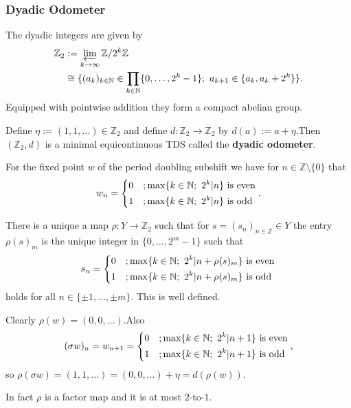 \begin{frame}
	\frametitle{Dyadic Odometer}
	The dyadic integers are given by
	\begin{align*}
		\mathbb{Z}_2 &:= \varprojlim_{k \to \infty} \mathbb{Z}/2^k\mathbb{Z}\\
		&\cong \{(a_k)_{k \in \mathbb{N}} \in \prod_{k \in \mathbb{N}} \{0, \dots, 2^k-1\};\ a_{k+1} \in \{a_k, a_k + 2^k\}\}.
	\end{align*}\pause
	Equipped with pointwise addition they form a compact abelian group.\pause
	
	Define $\eta := (1, 1, \dots) \in \mathbb{Z}_2$ and define $d: \mathbb{Z}_2 \to \mathbb{Z}_2$ by $d(a) := a + \eta$.\pause Then $(\mathbb{Z}_2, d)$ is a minimal equicontinuous TDS called the \textbf{dyadic odometer}.
\end{frame}

\begin{frame}
	For the fixed point $w$ of the period doubling subshift we have for $n \in \mathbb{Z} \setminus \{0\}$ that
	\begin{align*}
		w_n =
		\begin{dcases}
			0 &; \max\{k \in \mathbb{N};\ 2^k | n\} \text{ is even}\\
			1 &; \max\{k \in \mathbb{N};\ 2^k | n\} \text{ is odd}
		\end{dcases}.
	\end{align*}\pause
	\medskip
	
	There is a unique a map $\rho: Y \to \mathbb{Z}_2$ such that for $ s = (s_n)_{n \in \mathbb{Z}} \in Y$ the entry $\rho(s)_m$ is the unique integer in $\{0, \dots, 2^m-1\}$ such that
	\begin{align*}
		s_n =
		\begin{dcases}
			0 &; \max\{k \in \mathbb{N};\ 2^k | n + \rho(s)_m\} \text{ is even}\\
			1 &; \max\{k \in \mathbb{N};\ 2^k | n + \rho(s)_m\} \text{ is odd}
		\end{dcases}
	\end{align*}
	holds for all $n \in \{\pm 1, \dots, \pm m\}$. This is well defined.\pause
	\medskip
	
	Clearly $\rho(w) = (0, 0, \dots)$.\pause Also
	\begin{align*}
		(\sigma w)_n = w_{n+1} =
		\begin{dcases}
			0 &; \max\{k \in \mathbb{N};\ 2^k | n+1\} \text{ is even}\\
			1 &; \max\{k \in \mathbb{N};\ 2^k | n+1\} \text{ is odd}
		\end{dcases},
	\end{align*}
	so $\rho(\sigma w) = (1, 1, \dots ) = (0, 0, \dots) + \eta = d(\rho(w))$.\pause
	
	In fact $\rho$ is a factor map and it is at most $2$-to-$1$.
\end{frame}

